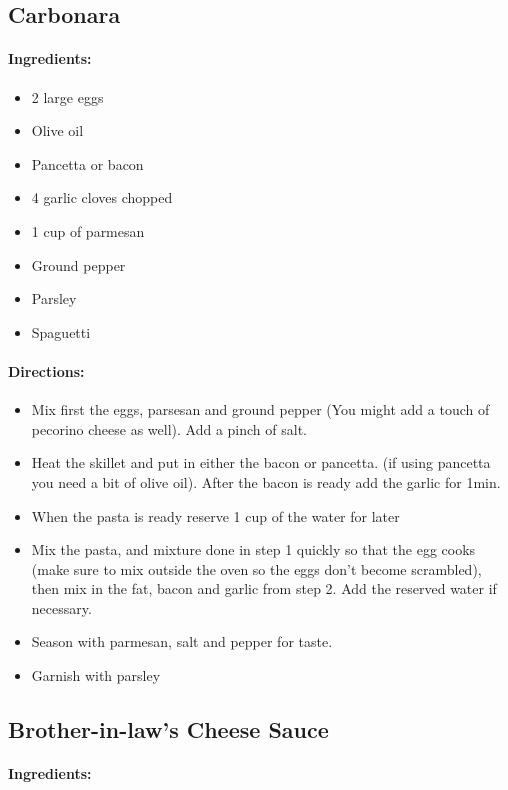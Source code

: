 \documentclass{article}
\begin{document}
\subsection{Carbonara}

\paragraph{Ingredients:}

\begin{itemize}
	\item 2 large eggs
	\item Olive oil
	\item Pancetta or bacon
	\item 4 garlic cloves chopped
	\item 1 cup of parmesan
	\item Ground pepper
	\item Parsley
	\item Spaguetti
\end{itemize}

\paragraph{Directions:}
\begin{itemize}
	\item Mix first the eggs, parsesan and ground pepper (You might add a touch of pecorino cheese as well). Add a pinch of salt.
	\item Heat the skillet and put in either the bacon or pancetta. (if using pancetta you need a bit of olive oil). After the bacon is ready add the garlic for 1min.
	\item When the pasta is ready reserve 1 cup of the water for later
	\item Mix the pasta, and mixture done in step 1 quickly so that the egg cooks (make sure to mix outside the oven so the eggs don’t become scrambled), then mix in the fat, bacon and garlic from step 2. Add the reserved water if necessary.
	\item Season with parmesan, salt and pepper for taste.
	\item Garnish with parsley
\end{itemize}


\subsection{Brother-in-law’s Cheese Sauce}
\paragraph{Ingredients:}
\end{document}
